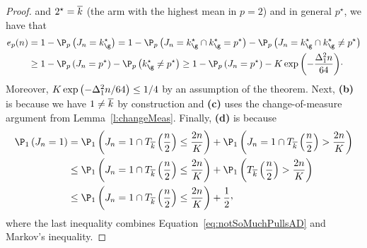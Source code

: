 \begin{proof}
	and $2^\star=\overline k$ (the arm with the highest mean in  $p=2$)
	and in general $p^\star$, we have that
	\begin{align*}	
	\ProErr_{p}(\timeHorizon)
	&=
	1- \Pro_{p}\left(\recomArm_\timeHorizon=\bestArm_{\gainVector}\right)
	=
	1- \Pro_{p}\left(\recomArm_\timeHorizon=\bestArm_{\gainVector} 
	\cap \bestArm_{\gainVector}=p^\star\right)
	- \Pro_{p}\left(\recomArm_\timeHorizon=\bestArm_{\gainVector}
	\cap\bestArm_{\gainVector}\neq p^\star\right)\\
&	\geq
	1-
	\Pro_{p}\left(\recomArm_\timeHorizon=p^\star\right)
	- \Pro_{p}\left(\bestArm_{\gainVector}\neq p^\star\right)
		\geq
	1-
	\Pro_{p}\left(\recomArm_\timeHorizon=p^\star\right)
	- \nArms\exp\left(-\frac{\gap^2_1\timeHorizon}{64}\right)\!\cdot
	\end{align*}
	Moreover, 
	$K\exp\left(-\Delta^2_1n/64\right) \leq 1/4$ 
	by an assumption of the theorem.
%	
	Next, \textbf{(b)}  is because we have $1\neq\overline k$ 
	by construction and
	\textbf{(c)} uses the change-of-measure 
	argument from Lemma~\ref{l:changeMeas}. %
	Finally, \textbf{(d)} is because 
	\begin{align*}
	\Pro_{1}\left(\recomArm_\timeHorizon=1 \right)
	&=
	\Pro_{1}\left(\recomArm_\timeHorizon=1 \cap \pullsNumber_{\refarm} \left(\frac{\timeHorizon}{2}\right) 
	\leq \frac{2\timeHorizon}{\nArms} \right)
	+
	\Pro_{1}\left(\recomArm_\timeHorizon=1 \cap 
	\pullsNumber_{\refarm} \left(\frac{\timeHorizon}{2}\right) 
	> \frac{2\timeHorizon}{\nArms} \right)\\
	&\leq
	\Pro_{1}\left(\recomArm_\timeHorizon=1\cap \pullsNumber_{\refarm} \left(\frac{\timeHorizon}{2}\right) 
	\leq \frac{2\timeHorizon}{\nArms} \right)
	+
	\Pro_{1}\left( \pullsNumber_{\refarm} \left(\frac{\timeHorizon}{2}\right) 
	> \frac{2\timeHorizon}{\nArms} \right)\\
	&\leq
	\Pro_{1}\left(\recomArm_\timeHorizon=1 \cap \pullsNumber_{\refarm} \left(\frac{\timeHorizon}{2}\right) 
	\leq \frac{2\timeHorizon}{\nArms} \right)
	+
	\frac12\CommaBin
	\end{align*}
	where the last inequality combines Equation~\ref{eq:notSoMuchPullsAD} 
	and Markov's inequality.
	

\end{proof}

